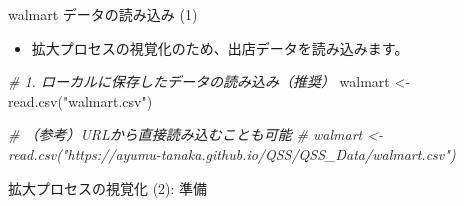 \documentclass[
  ignorenonframetext,
]{beamer}
\newenvironment{Shaded}{\begin{snugshade}}{\end{snugshade}}
\newcommand{\CommentTok}[1]{\textcolor[rgb]{0.56,0.35,0.01}{\textit{#1}}}
\newcommand{\ConstantTok}[1]{\textcolor[rgb]{0.00,0.00,0.00}{#1}}
\newcommand{\DecValTok}[1]{\textcolor[rgb]{0.00,0.00,0.81}{#1}}
\newcommand{\FloatTok}[1]{\textcolor[rgb]{0.00,0.00,0.81}{#1}}
\newcommand{\FunctionTok}[1]{\textcolor[rgb]{0.00,0.00,0.00}{#1}}
\newcommand{\NormalTok}[1]{#1}
\newcommand{\OtherTok}[1]{\textcolor[rgb]{0.56,0.35,0.01}{#1}}
\newcommand{\SpecialCharTok}[1]{\textcolor[rgb]{0.00,0.00,0.00}{#1}}
\newcommand{\StringTok}[1]{\textcolor[rgb]{0.31,0.60,0.02}{#1}}
\providecommand{\tightlist}{%
  \setlength{\itemsep}{0pt}\setlength{\parskip}{0pt}}
\begin{document}
\begin{frame}[fragile]{walmart データの読み込み (1)}
\protect\hypertarget{walmart-ux30c7ux30fcux30bfux306eux8aadux307fux8fbcux307f-1}{}
\begin{itemize}
\tightlist
\item
  拡大プロセスの視覚化のため、出店データを読み込みます。
\end{itemize}

\scriptsize

\begin{Shaded}
\begin{Highlighting}[]
\CommentTok{\# 1. ローカルに保存したデータの読み込み（推奨）}
\NormalTok{walmart }\OtherTok{\textless{}{-}} \FunctionTok{read.csv}\NormalTok{(}\StringTok{"walmart.csv"}\NormalTok{)}

\CommentTok{\# （参考）URLから直接読み込むことも可能}
\CommentTok{\# walmart \textless{}{-} read.csv("https://ayumu{-}tanaka.github.io/QSS/QSS\_Data/walmart.csv")}
\end{Highlighting}
\end{Shaded}

\normalsize
\end{frame}

\begin{frame}[fragile]{拡大プロセスの視覚化 (2): 準備}
\protect\hypertarget{ux62e1ux5927ux30d7ux30edux30bbux30b9ux306eux8996ux899aux5316-2-ux6e96ux5099}{}
\scriptsize

\begin{Shaded}
\end{Shaded}

\normalsize
\end{frame}
\end{document}
